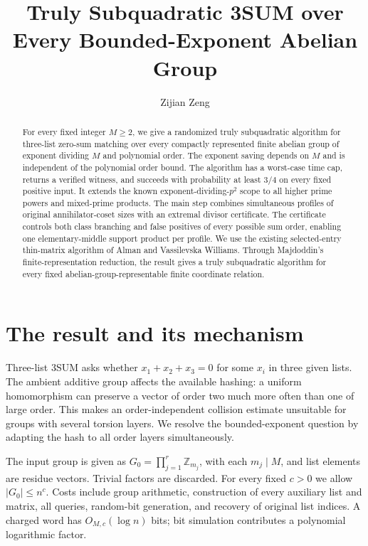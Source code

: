 \documentclass[acmsmall,11pt,nonacm,natbib=false]{acmart}
\title{Truly Subquadratic 3SUM over Every Bounded-Exponent Abelian Group}
\author{Zijian Zeng}
\affiliation{\institution{UCSI University}\country{Malaysia}}
\newcommand{\Z}{\mathbb Z}
\begin{document}
\begin{abstract}
\normalsize
For every fixed integer $M\ge2$, we give a randomized truly subquadratic
algorithm for three-list zero-sum matching over every compactly represented
finite abelian group of exponent dividing $M$ and polynomial order. The
exponent saving depends on $M$ and is independent of the polynomial order
bound. The algorithm has a worst-case time cap, returns a verified witness,
and succeeds with probability at least $3/4$ on every fixed positive input.
It extends the known exponent-dividing-$p^2$ scope to all higher prime powers
and mixed-prime products. The main step combines simultaneous profiles of
original annihilator-coset sizes with an extremal divisor certificate. The
certificate controls both class branching and false positives of every
possible sum order, enabling one elementary-middle support product per
profile. We use the existing selected-entry thin-matrix algorithm of Alman
and Vassilevska Williams. Through Majdoddin's finite-representation reduction,
the result gives a truly subquadratic algorithm for every fixed
abelian-group-representable finite coordinate relation.
\end{abstract}
\maketitle
\clearpage

\section{The result and its mechanism}

Three-list 3SUM asks whether $x_1+x_2+x_3=0$ for some $x_i$ in three given
lists. The ambient additive group affects the available hashing: a uniform
homomorphism can preserve a vector of order two much more often than one of
large order. This makes an order-independent collision estimate unsuitable
for groups with several torsion layers. We resolve the bounded-exponent
question by adapting the hash to all order layers simultaneously.

The input group is given as $G_0=\prod_{j=1}^r\Z_{m_j}$, with each
$m_j\mid M$, and list elements are residue vectors. Trivial factors are
discarded. For every fixed $c>0$ we allow $|G_0|\le n^c$. Costs include group
arithmetic, construction of every auxiliary list and matrix, all queries,
random-bit generation, and recovery of original list indices. A charged
word has $O_{M,c}(\log n)$ bits; bit simulation contributes a polynomial
logarithmic factor.
\end{document}
